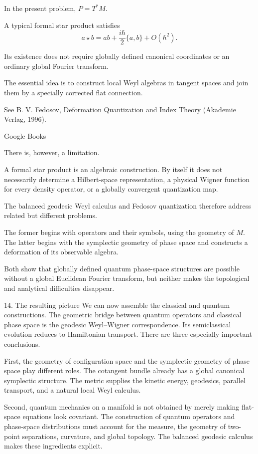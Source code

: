 In the present problem, \(P=T^*M\).

A typical formal star product satisfies
\[
a\star b
=
ab+\frac{i\hbar}{2}\{a,b\}+O(\hbar^2).
\tag{114}
\]

Its existence does not require globally defined canonical coordinates or an ordinary global Fourier transform.

The essential idea is to construct local Weyl algebras in tangent spaces and join them by a specially corrected flat connection.

See B. V. Fedosov, Deformation Quantization and Index Theory (Akademie Verlag, 1996). 

Google Books




There is, however, a limitation.

A formal star product is an algebraic construction. By itself it does not necessarily determine a Hilbert-space representation, a physical Wigner function for every density operator, or a globally convergent quantization map.

The balanced geodesic Weyl calculus and Fedosov quantization therefore address related but different problems.

The former begins with operators and their symbols, using the geometry of \(M\). The latter begins with the symplectic geometry of phase space and constructs a deformation of its observable algebra.

Both show that globally defined quantum phase-space structures are possible without a global Euclidean Fourier transform, but neither makes the topological and analytical difficulties disappear.

14. The resulting picture
We can now assemble the classical and quantum constructions.
The geometric bridge between quantum operators and classical phase space is the geodesic Weyl–Wigner correspondence. Its semiclassical evolution reduces to Hamiltonian transport.
There are three especially important conclusions.

First, the geometry of configuration space and the symplectic geometry of phase space play different roles. The cotangent bundle already has a global canonical symplectic structure. The metric supplies the kinetic energy, geodesics, parallel transport, and a natural local Weyl calculus.

Second, quantum mechanics on a manifold is not obtained by merely making flat-space equations look covariant. The construction of quantum operators and phase-space distributions must account for the measure, the geometry of two-point separations, curvature, and global topology. The balanced geodesic calculus makes these ingredients explicit.

